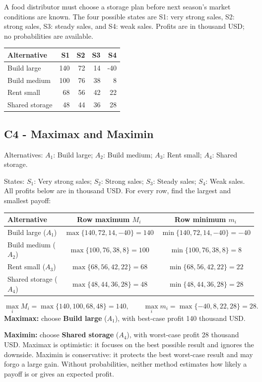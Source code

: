 \clearpage
{}
A food distributor must choose a storage plan before next season's market conditions are known. The four possible states are S1: very strong sales, S2: strong sales, S3: steady sales, and S4: weak sales. Profits are in thousand USD; no probabilities are available.
\begin{center}\small\setlength{\tabcolsep}{4pt}
\begin{tabular}{@{}lrrrr@{}}\toprule
Alternative&S1&S2&S3&S4\\\midrule
Build large&140&72&14&-40\\
Build medium&100&76&38&8\\
Rent small&68&56&42&22\\
Shared storage&48&44&36&28\\\bottomrule
\end{tabular}\end{center}
\subsection*{C4 - Maximax and Maximin }
\label{sol:cold-storage-c4}
Alternatives: $A_1$: Build large; $A_2$: Build medium; $A_3$: Rent small; $A_4$: Shared storage.\par
States: $S_1$: Very strong sales; $S_2$: Strong sales; $S_3$: Steady sales; $S_4$: Weak sales.
All profits below are in thousand USD. For every row, find the largest and smallest payoff:
\begin{center}
\begin{tabular}{@{}lcc@{}}\toprule
Alternative & Row maximum $M_i$ & Row minimum $m_i$\\\midrule
Build large ($A_1$) & $\max\{140,72,14,-40\}=140$ & $\min\{140,72,14,-40\}=-40$\\
Build medium ($A_2$) & $\max\{100,76,38,8\}=100$ & $\min\{100,76,38,8\}=8$\\
Rent small ($A_3$) & $\max\{68,56,42,22\}=68$ & $\min\{68,56,42,22\}=22$\\
Shared storage ($A_4$) & $\max\{48,44,36,28\}=48$ & $\min\{48,44,36,28\}=28$\\
\bottomrule\end{tabular}
\end{center}
\[\max_i M_i=\max\{140,100,68,48\}=140,\qquad \max_i m_i=\max\{-40,8,22,28\}=28.\]
\textbf{Maximax:} choose \textbf{Build large} ($A_1$), with best-case profit 140 thousand USD.\par
\textbf{Maximin:} choose \textbf{Shared storage} ($A_4$), with worst-case profit 28 thousand USD.
Maximax is optimistic: it focuses on the best possible result and ignores the downside. Maximin is conservative: it protects the best worst-case result and may forgo a large gain. Without probabilities, neither method estimates how likely a payoff is or gives an expected profit.

